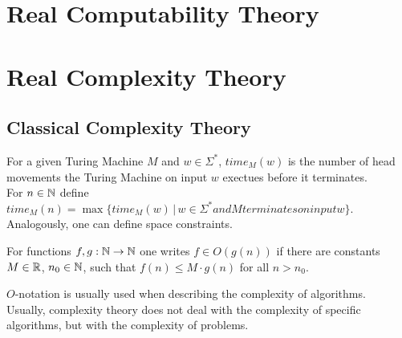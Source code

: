 \section{Real Computability Theory}
  \section{Real Complexity Theory}
  \subsection{Classical Complexity Theory}
  \begin{definition}
  For a given Turing Machine $M$ and $w \in \Sigma^*$, $time_M(w)$ is the number of head movements 
  the Turing Machine on input $w$ exectues before it terminates. \\
  For $n \in \mathbb N$ define $time_M(n) = \max \{ time_M(w) \,|\, w \in \Sigma^* and M terminates on input w \}$.\\
  Analogously, one can define space constraints.
  \end{definition}
 \begin{definition}
  For functions $f, g: \mathbb N \to \mathbb N$ one writes $f \in O(g(n))$ if there are constants $M \in \mathbb R$, $n_0 \in \mathbb N$, such that
  $ f(n) \leq M \cdot g(n)$ for all $n > n_0$. 
  \end{definition}
  $O$-notation is usually used when describing the complexity of algorithms. \\
  Usually, complexity theory does not deal with the complexity of specific algorithms, but with the complexity of problems. 

